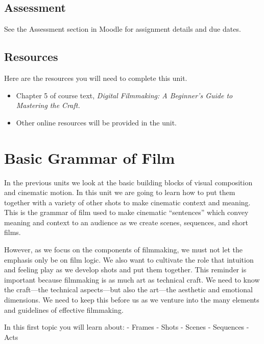 \documentclass[
]{book}
\providecommand{\tightlist}{%
  \setlength{\itemsep}{0pt}\setlength{\parskip}{0pt}}
\begin{document}
\hypertarget{assessment-7}{%
\subsection*{Assessment}\label{assessment-7}}

See the Assessment section in Moodle for assignment details and due dates.

\hypertarget{resources-4}{%
\subsection*{Resources}\label{resources-4}}

Here are the resources you will need to complete this unit.

\begin{itemize}
\tightlist
\item
  Chapter 5 of course text, \emph{Digital Filmmaking: A Beginner's Guide to Mastering the Craft.}
\item
  Other online resources will be provided in the unit.
\end{itemize}

\hypertarget{basic-grammar-of-film}{%
\section{Basic Grammar of Film}\label{basic-grammar-of-film}}

In the previous units we look at the basic building blocks of visual composition and cinematic motion. In this unit we are going to learn how to put them together with a variety of other shots to make cinematic context and meaning. This is the grammar of film used to make cinematic ``sentences'' which convey meaning and context to an audience as we create scenes, sequences, and short films.

However, as we focus on the components of filmmaking, we must not let the emphasis only be on film logic. We also want to cultivate the role that intuition and feeling play as we develop shots and put them together. This reminder is important because filmmaking is as much art as technical craft. We need to know the craft---the technical aspects---but also the art---the aesthetic and emotional dimensions. We need to keep this before us as we venture into the many elements and guidelines of effective filmmaking.

In this first topic you will learn about:
- Frames
- Shots
- Scenes
- Sequences
- Acts
\end{document}
